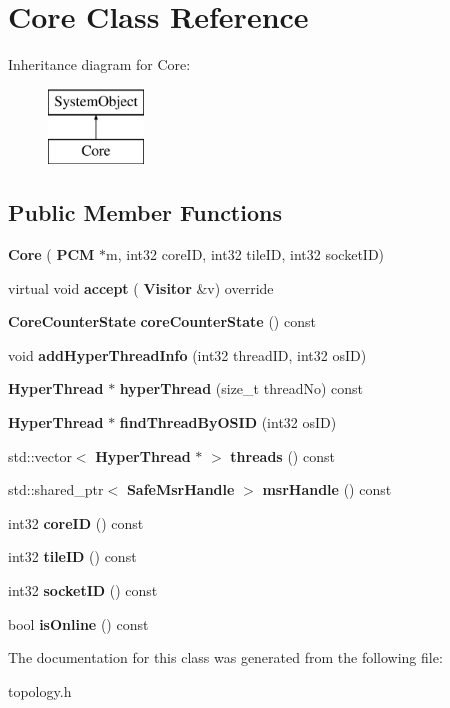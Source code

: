 \section{Core Class Reference}
\label{classCore}
Inheritance diagram for Core\+:\begin{figure}[H]
\begin{center}
\leavevmode
\includegraphics[height=2.000000cm]{classCore}
\end{center}
\end{figure}
\subsection*{Public Member Functions}
\begin{DoxyCompactItemize}
\item 
\mbox{\label{classCore_a2a7024d0cd523f0e2d55a3b9f34a9239}} 
{\bfseries Core} (\textbf{ P\+CM} $\ast$m, int32 core\+ID, int32 tile\+ID, int32 socket\+ID)
\item 
\mbox{\label{classCore_ab8f6b784f3dc076c3f25e4256890a18d}} 
virtual void {\bfseries accept} (\textbf{ Visitor} \&v) override
\item 
\mbox{\label{classCore_a0a6f081727ada553297b1ce6cb383e09}} 
\textbf{ Core\+Counter\+State} {\bfseries core\+Counter\+State} () const
\item 
\mbox{\label{classCore_af7ed7c619ad5fb4d18d30993d173eb45}} 
void {\bfseries add\+Hyper\+Thread\+Info} (int32 thread\+ID, int32 os\+ID)
\item 
\mbox{\label{classCore_a6c613d4e4d8c0fde3184d5571a1d506b}} 
\textbf{ Hyper\+Thread} $\ast$ {\bfseries hyper\+Thread} (size\+\_\+t thread\+No) const
\item 
\mbox{\label{classCore_aca06b352113b12c0a3f8c8b1fa7dcb6c}} 
\textbf{ Hyper\+Thread} $\ast$ {\bfseries find\+Thread\+By\+O\+S\+ID} (int32 os\+ID)
\item 
\mbox{\label{classCore_aabeca73b708a904e5b72e3f254945fc4}} 
std\+::vector$<$ \textbf{ Hyper\+Thread} $\ast$ $>$ {\bfseries threads} () const
\item 
\mbox{\label{classCore_afff2df3a1a873da99e254bfc4cecbdb7}} 
std\+::shared\+\_\+ptr$<$ \textbf{ Safe\+Msr\+Handle} $>$ {\bfseries msr\+Handle} () const
\item 
\mbox{\label{classCore_a4717fc50fc0b93610d739252685fc248}} 
int32 {\bfseries core\+ID} () const
\item 
\mbox{\label{classCore_a0c2a25f331ac21b1eaaddebe0e816673}} 
int32 {\bfseries tile\+ID} () const
\item 
\mbox{\label{classCore_aabba807be1b84746a5838575714dcbee}} 
int32 {\bfseries socket\+ID} () const
\item 
\mbox{\label{classCore_aadf315c3054975bc09cf4478365d2103}} 
bool {\bfseries is\+Online} () const
\end{DoxyCompactItemize}


The documentation for this class was generated from the following file\+:\begin{DoxyCompactItemize}
\item 
topology.\+h\end{DoxyCompactItemize}
